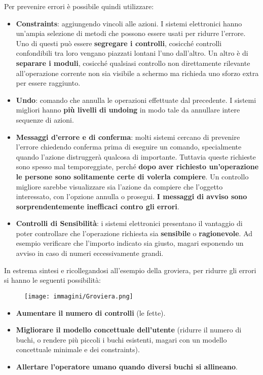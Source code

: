Per prevenire errori è possibile quindi utilizzare:
\begin{itemize}
	\itemsep-0.3em
	\item \textbf{Constraints}: aggiungendo vincoli alle azioni. I sistemi elettronici hanno un'ampia selezione di metodi che possono essere usati per
	ridurre l'errore. Uno di questi può essere \textbf{segregare i controlli}, cosicché controlli confondibili tra loro vengano piazzati lontani l'uno
	dall'altro. Un altro è di \textbf{separare i moduli}, cosicché qualsiasi controllo non direttamente rilevante all'operazione corrente non sia visibile
	a schermo ma richieda uno sforzo extra per essere raggiunto.
	\item \textbf{Undo}: comando che annulla le operazioni effettuate dal precedente. I sistemi migliori hanno \textbf{più livelli di undoing} in modo
	tale da annullare intere sequenze di azioni.
	\item \textbf{Messaggi d'errore e di conferma}: molti sistemi cercano di prevenire l'errore chiedendo conferma prima di eseguire un comando,
	specialmente quando l'azione distruggerà qualcosa di importante. Tuttavia queste richieste sono spesso mal temporeggiate, perché \textbf{dopo aver
	richiesto un'operazione le persone sono solitamente certe di volerla compiere}. Un controllo migliore sarebbe visualizzare sia l'azione da compiere
	che l'oggetto interessato, con l'opzione annulla o prosegui.\textbf{ I messaggi di avviso sono sorprendentemente inefficaci contro gli errori}.

	\item  \textbf{Controlli di Sensibilità}: i sistemi elettronici presentano il vantaggio di poter controllare che l'operazione richiesta sia
	\textbf{sensibile} o \textbf{ragionevole}. Ad esempio verificare che l'importo indicato sia giusto, magari esponendo un avviso in caso di numeri
	eccessivamente grandi.
\end{itemize}

In estrema sintesi e ricollegandosi all'esempio della groviera, per ridurre gli errori si hanno le seguenti possibilità:

\begin{figure}[!h]
	\centering
	\texttt{[image: immagini/Groviera.png]}
\end{figure}

\begin{itemize}
	\item \textbf{Aumentare il numero di controlli} (le fette).
	\item \textbf{Migliorare il modello concettuale dell'utente} (ridurre il numero di buchi, o rendere più piccoli i buchi esistenti, magari con un
	modello concettuale minimale e dei constraints).
	\item \textbf{Allertare l'operatore umano quando diversi buchi si allineano}.
\end{itemize}
